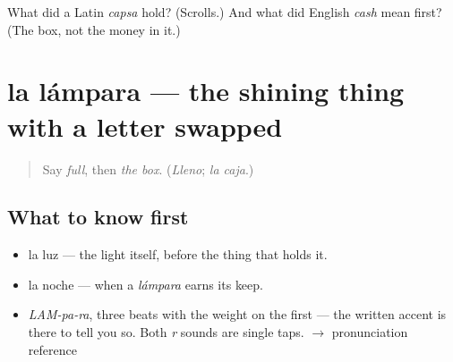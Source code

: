 \begin{tcolorbox}[breakable,colback=teal!4,colframe=teal!35!black,title={Before you move on}]
What did a Latin \emph{capsa} hold? (Scrolls.) And what did English \emph{cash} mean first? (The box, not the money in it.)
\end{tcolorbox}
\section[la lámpara]{la lámpara — the shining thing with a letter swapped}

\label{lesson:ES-C366-lampara}



\begin{quote}
Say \emph{full}, then \emph{the box}. (\emph{Lleno}; \emph{la caja}.)
\end{quote}

\subsection*{What to know first}
\begin{itemize}
\raggedright
  \item la luz — the light itself, before the thing that holds it.
  \item la noche — when a \emph{lámpara} earns its keep.
\end{itemize}

\begin{sounds}
\begin{itemize}
\raggedright
  \item \emph{LAM-pa-ra}, three beats with the weight on the first — the written accent is there to tell you so. Both \emph{r} sounds are single taps. $\to$ pronunciation reference
\end{itemize}
\end{sounds}

